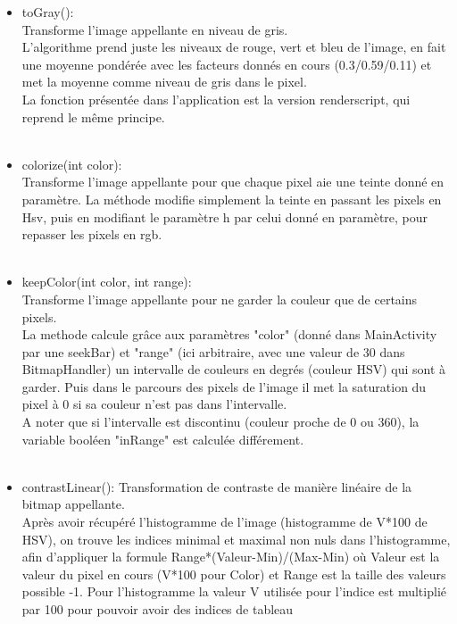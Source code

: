 \documentclass[12pt]{article}
\begin{document}
    \begin{itemize}
        \item toGray():\\ 
        Transforme l'image appellante en niveau de gris.\\
        L'algorithme prend juste les niveaux de rouge, vert et bleu de l'image, en fait une moyenne pondérée avec les facteurs donnés en cours (0.3/0.59/0.11) 
        et met la moyenne comme niveau de gris dans le pixel.
        \\
        La fonction présentée dans l'application est la version renderscript, qui reprend le même principe.\\
        \\
        \item colorize(int color):\\
        Transforme l'image appellante pour que chaque pixel aie une teinte donné en paramètre.
        La méthode modifie simplement la teinte en passant les pixels en Hsv, puis en modifiant le paramètre h par celui donné en paramètre, pour repasser les pixels en rgb.\\ 
        \\
        \item keepColor(int color, int range):\\
        Transforme l'image appellante pour ne garder la couleur que de certains pixels.\\
        La methode calcule grâce aux paramètres "color" (donné dans MainActivity par une seekBar) et "range" (ici arbitraire, avec une valeur de 30 dans BitmapHandler) un intervalle de couleurs en degrés (couleur HSV) qui sont à garder. Puis dans le parcours des pixels de l'image il 
        met la saturation du pixel à 0 si sa couleur n'est pas dans l'intervalle.\\
        A noter que si l'intervalle est discontinu (couleur proche de 0 ou 360), la variable booléen "inRange" est calculée différement.\\
        \\
        \item contrastLinear():
        Transformation de contraste de manière linéaire de la bitmap appellante.\\
        Après avoir récupéré l'histogramme de l'image (histogramme de V*100 de HSV),
        on trouve les indices minimal et maximal non nuls dans l'histogramme, afin d'appliquer la formule Range*(Valeur-Min)/(Max-Min) où Valeur est 
        la valeur du pixel en cours (V*100 pour Color) et Range est la taille des valeurs possible -1. Pour l'histogramme la valeur V utilisée pour l'indice est multiplié par 100 pour pouvoir avoir des indices de tableau 

\end{itemize}
\end{document}
